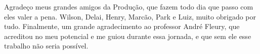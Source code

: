 \begin{agradecimentos}

Agradeço meus grandes amigos da Produção, que fazem todo dia que passo com eles valer a pena. Wilson, Delai, Henry, Marcão, Park e Luiz, muito obrigado por tudo. Finalmente, um grande agradecimento ao professor André Fleury, que acreditou no meu potencial e me guiou durante essa jornada, e que sem ele esse trabalho não seria possível.

\end{agradecimentos}